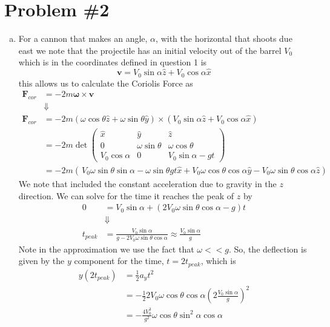 \documentclass[11pt]{article}
\numberwithin{equation}{section}
\begin{document}
\pagebreak

\section{Problem \#2}
\begin{enumerate}[(a)]
\item For a cannon that makes an angle, $\alpha$, with the horizontal that shoots due east
we note that the projectile has an initial velocity out of the barrel $V_0$ which is in
the coordinates defined in question 1 is
$$\mathbf{v} = V_0\sin\alpha\hat{z} + V_0\cos\alpha\hat{x}$$
this allows us to calculate the Coriolis Force as
\begin{align*}
\mathbf{F}_{cor} &= -2m\boldsymbol{\omega}\times\mathbf{v}\\
&\Downarrow\\
\mathbf{F}_{cor} &= -2m(\omega\cos\theta\hat{z}+\omega\sin\theta\hat{y})\times\left(V_0\sin\alpha\hat{z} + V_0\cos\alpha\hat{x}\right)\\
&= -2m\det\left(\begin{array}{ccc}
                 \hat{x}         &\hat{y}             &\hat{z}\\
                 0               &\omega\sin\theta    &\omega\cos\theta\\
                 V_0\cos\alpha   &0                   &V_0\sin\alpha-gt
           \end{array}\right)\\
&= -2m\left(\frac{}{}V_0\omega\sin\theta\sin\alpha - \omega\sin\theta{gt}\hat{x} + V_0\omega\cos\theta\cos\alpha\hat{y} - V_0\omega\sin\theta\cos\alpha\hat{z}\right)
\end{align*}
We note that included the constant acceleration due to gravity in the $z$ direction. 
We can solve for the time it reaches the peak of $z$ by
\begin{align*}
0 &= V_0\sin\alpha + (2V_0\omega\sin\theta\cos\alpha-g)t\\
&\Downarrow\\
t_{peak} &= \frac{V_0\sin\alpha}{g-2V_0\omega\sin\theta\cos\alpha} \approx \frac{V_0\sin\alpha}{g}
\end{align*}
Note in the approximation we use the fact that $\omega<<g$. So, the deflection is given by 
the $y$ component for the time, $t=2t_{peak}$, which is 
\begin{align*}
y(2t_{peak}) &= \frac{1}{2}a_yt^2\\
&= -\frac{1}{2}2V_0\omega\cos\theta\cos\alpha\left(2\frac{V_0\sin\alpha}{g}\right)^2\\
&= -\frac{4V_0^3}{g^2}\omega\cos\theta\sin^2\alpha\cos\alpha
\end{align*}


\end{enumerate}
\end{document}

